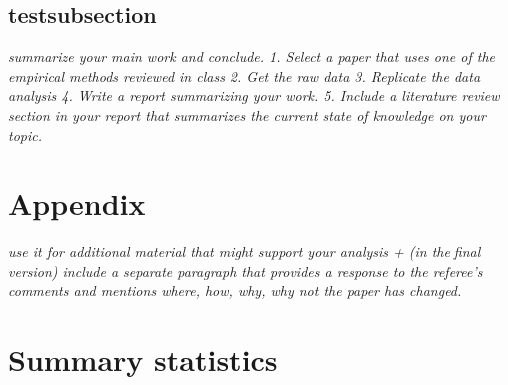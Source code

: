 \documentclass[11pt]{article}
\begin{document}
	\subsection{testsubsection}
	\textit{	summarize your main work and conclude.
		1. Select a paper that uses one of the empirical methods reviewed in class
		2. Get the raw data
		3. Replicate the data analysis
		4. Write a report summarizing your work.
		5. Include a literature review section in your report that summarizes the current state
		of knowledge on your topic.
	}

	
	
	\newpage
	
	\begin{subappendices}
		\appendix
		
		\section*{Appendix}\label{Appendix}
		\textit{use it for additional material that might support your analysis + (in thefinal version) include a separate paragraph that provides a response to the referee's comments and mentions where, how, why, why not the paper has changed.}
		\singlespacing
		\section{Summary statistics}\label{ASec:xxxxx}
		
		
	\end{subappendices}	
	
	
	
	\newpage
	{\footnotesize 
		
		\singlespacing
		
	}
	
	
\end{document}
